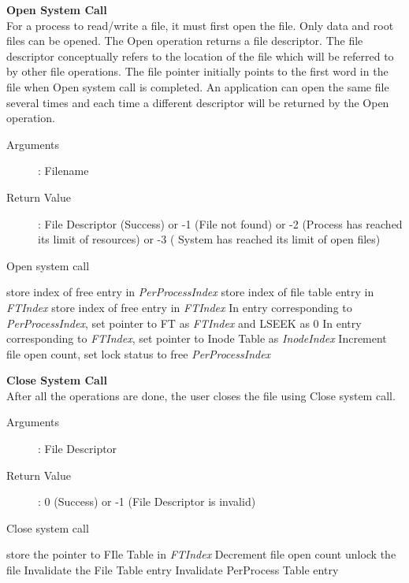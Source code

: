 \documentclass[10pt]{article}
\begin{document}
\textbf{Open System Call}\\
 For a process to read/write a file, it must first open the file. Only data and root files can be opened. The Open operation returns a file descriptor. The file descriptor conceptually refers to the location of the file which will be referred to by other file operations. The file pointer initially points to the first word in the file when Open system call is completed. An application can open the same file several times and each time a different descriptor will be returned by the Open operation. 
\begin{description}
	\item[Arguments]: Filename
	\item[Return Value]: File Descriptor (Success) or -1 (File not found) or -2 (Process has reached its limit of resources) or -3 ( 	System has reached its limit of open files)
\end{description} 
\begin{algorithm}
\caption{Open system call}
\begin{algorithmic}
\ENDIF
{}
\ENDIF
{}
\ELSE
    \STATE store index of free entry in \textit{PerProcessIndex}
\ENDIF    
{}
    \STATE store index of file table entry in \textit{FTIndex}
\ELSE
    \ELSE 
        \STATE store index of free entry in \textit{FTIndex}
    \ENDIF
\ENDIF
\STATE In entry corresponding to \textit{PerProcessIndex}, set pointer to FT as \textit{FTIndex} and LSEEK as 0
\STATE In entry corresponding to \textit{FTIndex}, set pointer to Inode Table as \textit{InodeIndex} 
\STATE Increment file open count, set lock status to free
\RETURN \textit{PerProcessIndex} 
\end{algorithmic}
\end{algorithm}
\textbf{Close System Call}\\
After all the operations are done, the user closes the file using Close system call. 
\begin{description}
	\item[Arguments]: File Descriptor
	\item[Return Value]: 0 (Success) or -1 (File Descriptor is invalid)
\end{description} 
\begin{algorithm}
\caption{Close system call}
\begin{algorithmic}
\ENDIF
{}
\ELSE 
    \STATE store the pointer to FIle Table in  \textit{FTIndex}
\ENDIF
\STATE Decrement file open count
    \STATE unlock the file
\ENDIF
{}
    \STATE Invalidate the File Table entry
    \ENDIF
\STATE Invalidate Per\-Process Table entry 
\end{algorithmic}
\end{algorithm}
\end{document}
